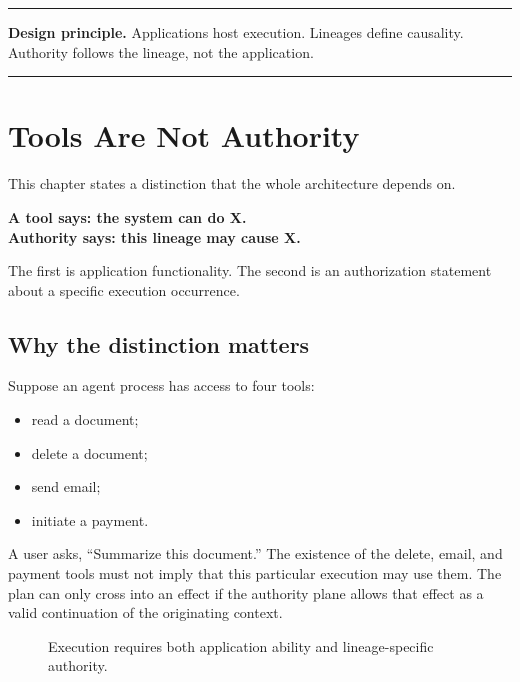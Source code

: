 \documentclass[10pt,oneside,openany]{book}
\newcommand{\principle}[1]{%
  \vspace{4pt}
  \noindent\begin{minipage}{\linewidth}
  \hrule\vspace{5pt}
  \small\sffamily\raggedright\textbf{Design principle.} #1
  \vspace{5pt}\hrule
  \end{minipage}\vspace{4pt}
}
\begin{document}
\principle{Applications host execution. Lineages define causality. Authority follows the lineage, not the application.}

\chapter{Tools Are Not Authority}

This chapter states a distinction that the whole architecture depends on.

\begin{center}
\sffamily\bfseries
A tool says: the system can do X.\\
Authority says: this lineage may cause X.
\end{center}

The first is application functionality. The second is an authorization statement about a specific execution occurrence.

\section{Why the distinction matters}
Suppose an agent process has access to four tools:

\begin{itemize}
\item read a document;
\item delete a document;
\item send email;
\item initiate a payment.
\end{itemize}

A user asks, ``Summarize this document.'' The existence of the delete, email, and payment tools must not imply that this particular execution may use them. The plan can only cross into an effect if the authority plane allows that effect as a valid continuation of the originating context.

\begin{figure}[ht]
\centering
{}
\caption{Execution requires both application ability and lineage-specific authority.}
\end{figure}
\end{document}
